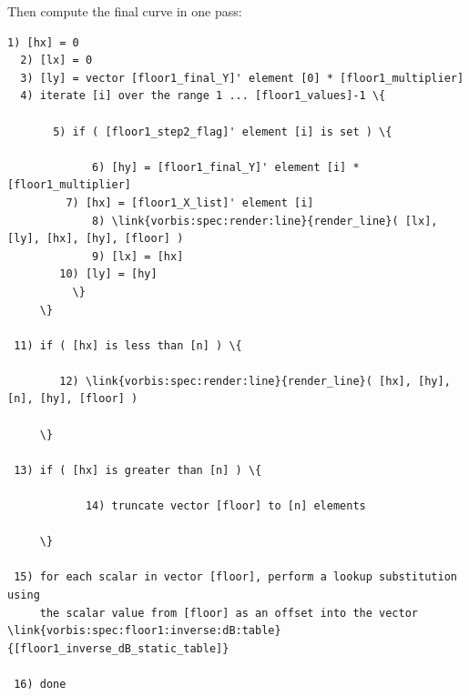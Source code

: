 \begin{description}
Then compute the final curve in one pass:

\begin{Verbatim}[commandchars=\\\{\}]
  1) [hx] = 0
  2) [lx] = 0
  3) [ly] = vector [floor1_final_Y]' element [0] * [floor1_multiplier]
  4) iterate [i] over the range 1 ... [floor1_values]-1 \{

       5) if ( [floor1_step2_flag]' element [i] is set ) \{

             6) [hy] = [floor1_final_Y]' element [i] * [floor1_multiplier]
 	     7) [hx] = [floor1_X_list]' element [i]
             8) \link{vorbis:spec:render:line}{render_line}( [lx], [ly], [hx], [hy], [floor] )
             9) [lx] = [hx]
	    10) [ly] = [hy]
          \}
     \}

 11) if ( [hx] is less than [n] ) \{

        12) \link{vorbis:spec:render:line}{render_line}( [hx], [hy], [n], [hy], [floor] )

     \}

 13) if ( [hx] is greater than [n] ) \{

            14) truncate vector [floor] to [n] elements

     \}

 15) for each scalar in vector [floor], perform a lookup substitution using
     the scalar value from [floor] as an offset into the vector \link{vorbis:spec:floor1:inverse:dB:table}{[floor1_inverse_dB_static_table]}

 16) done

\end{Verbatim}

\end{description}
